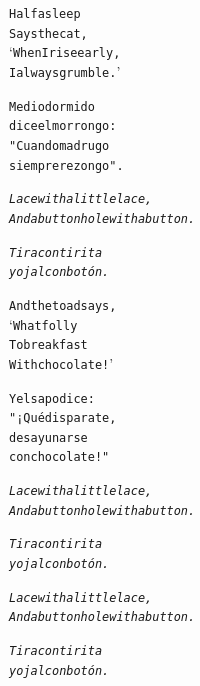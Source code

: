 \documentclass[11pt,a4paper]{article}
\begin{document}
\begin{parcolumns}{2}
\colchunk
{
\begin{alltt}\normalfont
Half asleep
Says the cat,
‘When I rise early,
I always grumble.’
\end{alltt}
}

\colchunk
{
\begin{alltt}\normalfont
Medio dormido
dice el morrongo:
"Cuando madrugo
siempre rezongo".
\end{alltt}
}

\colplacechunks

\colchunk
{
\begin{alltt}\normalfont
\emph{Lace with a little lace,
And a buttonhole with a button.}
\end{alltt}
}

\colchunk
{
\begin{alltt}\normalfont
\emph{Tira con tirita
y ojal con botón.}
\end{alltt}
}

\colplacechunks

\colchunk
{
\begin{alltt}\normalfont
And the toad says,
‘What folly
To breakfast
With chocolate!’
\end{alltt}
}

\colchunk
{
\begin{alltt}\normalfont
Y el sapo dice:
"¡Qué disparate,
desayunarse
con chocolate!"
\end{alltt}
}

\colplacechunks

\colchunk
{
\begin{alltt}\normalfont
\emph{Lace with a little lace,
And a buttonhole with a button.}
\end{alltt}
}

\colchunk
{
\begin{alltt}\normalfont
\emph{Tira con tirita
y ojal con botón.}
\end{alltt}
}

\colplacechunks

\colchunk
{
\begin{alltt}\normalfont
\emph{Lace with a little lace,
And a buttonhole with a button.}
\end{alltt}
}

\colchunk
{
\begin{alltt}\normalfont
\emph{Tira con tirita
y ojal con botón.}
\end{alltt}
}

\colplacechunks

\end{parcolumns}
\end{document}
